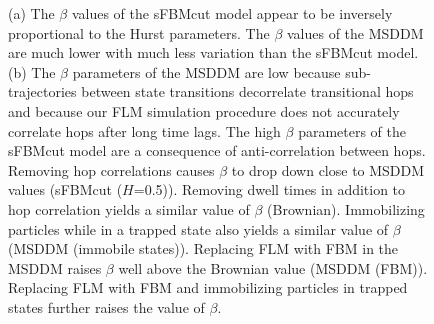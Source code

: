 \documentclass{article}
\begin{document}
\begin{figure}[h]
\begin{subfigure}{0.52\textwidth}
  \caption{}\label{fig:beta_parameters}
  \end{subfigure}
  \caption{(a) The $\beta$ values of the sFBMcut model appear to be inversely proportional
  to the Hurst parameters. The $\beta$ values of the MSDDM are much lower with much less
  variation than the sFBMcut model. (b) The $\beta$ parameters of the MSDDM are low because
  sub-trajectories between state transitions decorrelate transitional hops and because
  our FLM simulation procedure does not accurately correlate hops after long time lags. 
  The high $\beta$ parameters of the sFBMcut model are a consequence of anti-correlation
  between hops. Removing hop correlations causes $\beta$ to drop down close to MSDDM
  values (sFBMcut ($H$=0.5)). Removing dwell times in addition to hop correlation
  yields a similar value of $\beta$ (Brownian). Immobilizing particles while in a trapped state
  also yields a similar value of $\beta$ (MSDDM (immobile states)). Replacing FLM with
  FBM in the MSDDM raises $\beta$ well above the Brownian value (MSDDM (FBM)). Replacing FLM with FBM and
  immobilizing particles in trapped states further raises the value of $\beta$.}\label{fig:beta}
  \end{figure}

  \clearpage
  
\end{document}

